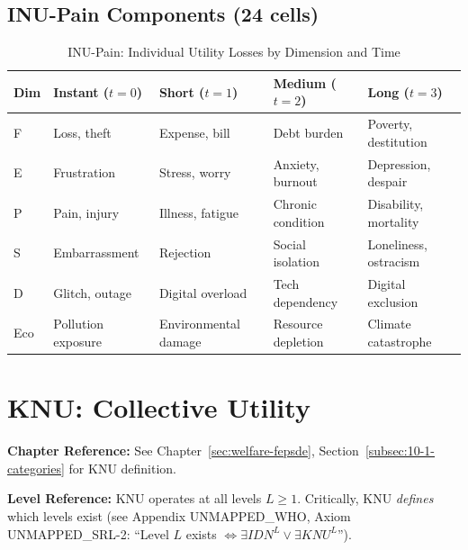 \subsection{INU-Pain Components (24 cells)}

\begin{table}[htbp]
\centering
\caption{INU-Pain: Individual Utility Losses by Dimension and Time}
\label{tab:app-c-inu-pain}
\small
\renewcommand{\arraystretch}{1.2}
\begin{tabular}{@{}lp{2.8cm}p{2.8cm}p{2.8cm}p{2.8cm}@{}}
\toprule
\textbf{Dim} & \textbf{Instant ($t=0$)} & \textbf{Short ($t=1$)} & \textbf{Medium ($t=2$)} & \textbf{Long ($t=3$)} \\
\midrule
F & Loss, theft & Expense, bill & Debt burden & Poverty, destitution \\
E & Frustration & Stress, worry & Anxiety, burnout & Depression, despair \\
P & Pain, injury & Illness, fatigue & Chronic condition & Disability, mortality \\
S & Embarrassment & Rejection & Social isolation & Loneliness, ostracism \\
D & Glitch, outage & Digital overload & Tech dependency & Digital exclusion \\
Eco & Pollution exposure & Environmental damage & Resource depletion & Climate catastrophe \\
\bottomrule
\end{tabular}
\end{table}

\section{KNU: Collective Utility}
\label{sec:app-c-knu}

\begin{cross-reference}
\textbf{Chapter Reference:} See Chapter~\ref{sec:welfare-fepsde}, 
Section~\ref{subsec:10-1-categories} for KNU definition.

\textbf{Level Reference:} KNU operates at all levels $L \geq 1$. Critically, 
KNU \textit{defines} which levels exist (see Appendix UNMAPPED_WHO, Axiom UNMAPPED_SRL-2: 
``Level $L$ exists $\iff \exists IDN^L \lor \exists KNU^L$'').
\end{cross-reference}

